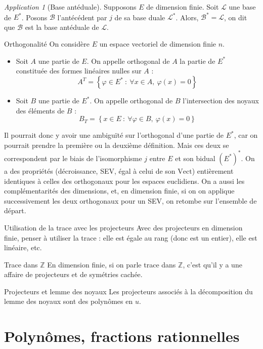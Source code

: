 \documentclass[french]{book}
\newcommand{\Z}{\mathbb{Z}}
\newcommand{\st}{^*}
\theoremstyle{plain}
\theoremstyle{definition}
\theoremstyle{remark}
\newtheorem*{app}{Application}
\begin{document}
\begin{app}[Base antéduale]
	Supposons $E$ de dimension finie. Soit $\mathcal{L}$ une base de $E\st$. Posons $\mathcal{B}$ l'antécédent par $j$ de sa base duale $\mathcal{L}\st$. Alors, $\mathcal{B}\st=\mathcal{L}$, on dit que $\mathcal{B}$ est la base antéduale de $\mathcal{L}$.
\end{app}
\begin{AS}{Orthogonalité} On considère $E$ un espace vectoriel de dimension finie $n$.
\begin{itemize}
	\item Soit $A$ une partie de $E$. On appelle orthogonal de $A$ la partie de $E\st$ constituée des formes linéaires nulles sur $A$ : $$A^T=\left\{\varphi\in E\st \ : \ \forall x\in A,\ \varphi(x)=0\right\}$$
	\item Soit $B$ une partie de $E\st$. On appelle orthogonal de $B$ l'intersection des noyaux des éléments de $B$ : $$B_T=\left\{x\in E\ : \ \forall\varphi\in B,\ \varphi(x)=0\right\}$$
\end{itemize} Il pourrait donc y avoir une ambiguïté sur l'orthogonal d'une partie de $E\st$, car on pourrait prendre la première ou la deuxième définition. Mais ces deux se correspondent par le biais de l'isomorphisme $j$ entre $E$ et son bidual $(E\st)\st$. On a des propriétés (décroissance, SEV, égal à celui de son $\text{Vect}$) entièrement identiques à celles des orthogonaux pour les espaces euclidiens. On a aussi les complémentarités des dimensions, et, en dimension finie, si on on applique successivement les deux orthogonaux pour un SEV, on retombe sur l'ensemble de départ.
\end{AS}
\begin{AS}{Utilisation de la trace avec les projecteurs} Avec des projecteurs en dimension finie, penser à utiliser la trace : elle est égale au rang (donc est un entier), elle est linéaire, etc.
\end{AS}
\begin{AS}{Trace dans $\Z$} En dimension finie, si on parle trace dans $\Z$, c'est qu'il y a une affaire de projecteurs et de symétries cachée.
\end{AS}
\begin{AS}{Projecteurs et lemme des noyaux} Les projecteurs associés à la décomposition du lemme des noyaux sont des polynômes en $u$.
\end{AS}


\chapter{Polynômes, fractions rationnelles}
\localtableofcontents
\end{document}
